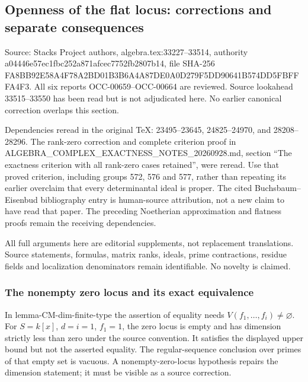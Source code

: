 \subsection{Openness of the flat locus: corrections and separate consequences}\label{algebra-proof-039-openness-of-the-flat-locus-corrections-and-separate-consequences}

Source: Stacks Project authors, algebra.tex:33227--33514, authority a04446e57ec1fbc252a871afcec7752fb2807b14, file SHA-256 FA8BB92E58A4F78A2BD01B3B6A4A87DE0A0D279F5DD90641B574DD5FBFFFA4F3. All six reports OCC-00659--OCC-00664 are reviewed. Source lookahead 33515--33550 has been read but is not adjudicated here. No earlier canonical correction overlaps this section.

Dependencies reread in the original TeX: 23495--23645, 24825--24970, and 28208--28296. The rank-zero correction and complete criterion proof in ALGEBRA\_COMPLEX\_EXACTNESS\_NOTES\_20260928.md, section ``The exactness criterion with all rank-zero cases retained'', were reread. Use that proved criterion, including groups 572, 576 and 577, rather than repeating its earlier overclaim that every determinantal ideal is proper. The cited Buchsbaum--Eisenbud bibliography entry is human-source attribution, not a new claim to have read that paper. The preceding Noetherian approximation and flatness proofs remain the receiving dependencies.

All full arguments here are editorial supplements, not replacement translations. Source statements, formulas, matrix ranks, ideals, prime contractions, residue fields and localization denominators remain identifiable. No novelty is claimed.

\subsubsection{The nonempty zero locus and its exact equivalence}\label{algebra-proof-039-the-nonempty-zero-locus-and-its-exact-equivalence}

In lemma-CM-dim-finite-type the assertion of equality needs \(V(f_1,\ldots,f_i)\ne\varnothing\). For \(S=k[x]\), \(d=i=1\), \(f_1=1\), the zero locus is empty and has dimension strictly less than zero under the source convention. It satisfies the displayed upper bound but not the asserted equality. The regular-sequence conclusion over primes of that empty set is vacuous. A nonempty-zero-locus hypothesis repairs the dimension statement; it must be visible as a source correction.

